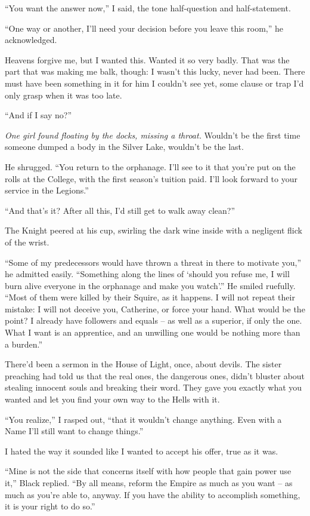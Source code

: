 \documentclass[12pt, openany]{book}
\begin{document}
“You want the answer now,” I said, the tone half-question and half-statement.

“One way or another, I’ll need your decision before you leave this room,” he acknowledged.

Heavens forgive me, but I wanted this. Wanted it so very badly. That was the part that was making me balk, though: I wasn’t this lucky, never had been. There must have been something in it for him I couldn’t see yet, some clause or trap I’d only grasp when it was too late.

“And if I say no?”

\textit{One girl found floating by the docks, missing a throat.} Wouldn’t be the first time someone dumped a body in the Silver Lake, wouldn’t be the last.

He shrugged. “You return to the orphanage. I’ll see to it that you’re put on the rolls at the College, with the first season’s tuition paid. I’ll look forward to your service in the Legions.”

“And that’s it? After all this, I’d still get to walk away clean?”

The Knight peered at his cup, swirling the dark wine inside with a negligent flick of the wrist.

“Some of my predecessors would have thrown a threat in there to motivate you,” he admitted easily. “Something along the lines of ‘should you refuse me, I will burn alive everyone in the orphanage and make you watch’.” He smiled ruefully. “Most of them were killed by their Squire, as it happens. I will not repeat their mistake: I will not deceive you, Catherine, or force your hand. What would be the point? I already have followers and equals – as well as a superior, if only the one. What I want is an apprentice, and an unwilling one would be nothing more than a burden.”

There’d been a sermon in the House of Light, once, about devils. The sister preaching had told us that the real ones, the dangerous ones, didn’t bluster about stealing innocent souls and breaking their word. They gave you exactly what you wanted and let you find your own way to the Hells with it.

“You realize,” I rasped out, “that it wouldn’t change anything. Even with a Name I’ll still want to change things.”

I hated the way it sounded like I wanted to accept his offer, true as it was. 

“Mine is not the side that concerns itself with how people that gain power use it,” Black replied. “By all means, reform the Empire as much as you want – as much as you’re able to, anyway. If you have the ability to accomplish something, it is your right to do so.” 
\end{document}
